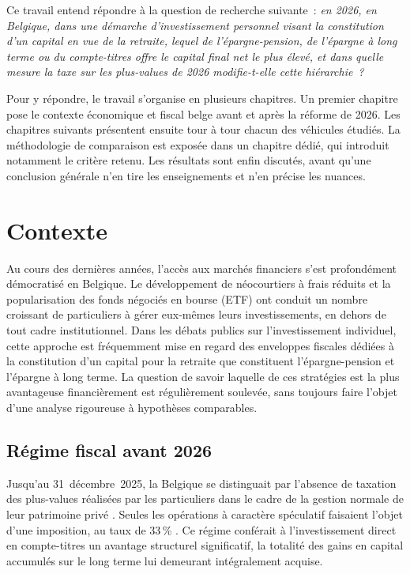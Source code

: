 ﻿\documentclass[12pt, a4paper]{article}
\begin{document}
Ce travail entend répondre à la question de recherche suivante~: \textit{en
2026, en Belgique, dans une démarche d'investissement personnel visant la
constitution d'un capital en vue de la retraite, lequel de l'épargne-pension,
de l'épargne à long terme ou du compte-titres offre le capital final net le
plus élevé, et dans quelle mesure la taxe sur les plus-values de 2026
modifie-t-elle cette hiérarchie~?}

Pour y répondre, le travail s'organise en plusieurs chapitres. Un premier
chapitre pose le contexte économique et fiscal belge avant et après la
réforme de 2026. Les chapitres suivants présentent ensuite tour à tour
chacun des véhicules étudiés. La méthodologie de comparaison est
exposée dans un chapitre dédié, qui introduit notamment le critère
retenu. Les résultats sont enfin discutés, avant qu'une conclusion
générale n'en tire les enseignements et n'en précise les nuances.

\newpage
\section{Contexte}

Au cours des dernières années, l'accès aux marchés financiers s'est profondément
démocratisé en Belgique. Le développement de néocourtiers à frais réduits et la
popularisation des fonds négociés en bourse (ETF) ont conduit un nombre croissant de
particuliers à gérer eux-mêmes leurs investissements, en dehors de tout cadre
institutionnel. Dans les débats publics sur l'investissement individuel, cette
approche est fréquemment mise en regard des enveloppes fiscales dédiées à la
constitution d'un capital pour la retraite que constituent l'épargne-pension et
l'épargne à long terme. La question de savoir laquelle de ces stratégies est la plus
avantageuse financièrement est régulièrement soulevée, sans toujours faire l'objet
d'une analyse rigoureuse à hypothèses comparables.

\subsection{Régime fiscal avant 2026}

Jusqu'au 31~décembre~2025, la Belgique se distinguait par l'absence de taxation des
plus-values réalisées par les particuliers dans le cadre de la gestion normale de
leur patrimoine privé \cite[art.~90]{cir92_2025}. Seules les opérations à caractère
spéculatif faisaient l'objet d'une imposition, au taux de 33\,\%
\cite[art.~171]{cir92_2025}. Ce régime conférait à l'investissement direct en
compte-titres un avantage structurel significatif, la totalité des gains en capital
accumulés sur le long terme lui demeurant intégralement acquise.
\end{document}
